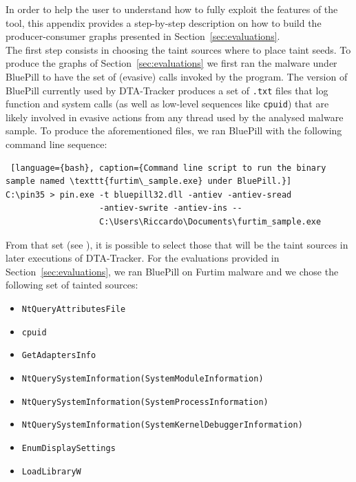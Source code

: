 \documentclass[LaM,binding=0.6cm]{sapthesis}
\begin{document}
In order to help the user to understand how to fully exploit the features of the tool, this appendix provides a step-by-step description on how to build the producer-consumer graphs presented in Section~\ref{sec:evaluations}.\\

The first step consists in choosing the taint sources where to place taint seeds. To produce the graphs of Section~\ref{sec:evaluations} we first ran the malware under BluePill to have the set of (evasive) calls invoked by the program. The version of BluePill currently used by {\sf DTA-Tracker} produces a set of \texttt{.txt} files that log function and system calls (as well as low-level sequences like {\tt cpuid}) that are likely involved in evasive actions from any thread used by the analysed malware sample. To produce the aforementioned files, we ran BluePill with the following command line sequence:
\begin{lstlisting} [language={bash}, caption={Command line script to run the binary sample named \texttt{furtim\_sample.exe} under BluePill.}]
C:\pin35 > pin.exe -t bluepill32.dll -antiev -antiev-sread 
				   -antiev-swrite -antiev-ins -- 
				   C:\Users\Riccardo\Documents\furtim_sample.exe
\end{lstlisting}

\noindent
From that set (see ), it is possible to select those that will be the taint sources in later executions of {\sf DTA-Tracker}. For the evaluations provided in Section~\ref{sec:evaluations}, we ran BluePill on Furtim malware and we chose the following set of tainted sources:
\begin{itemize}
\item \texttt{NtQueryAttributesFile}
\item \texttt{cpuid}
\item \texttt{GetAdaptersInfo}
\item \texttt{NtQuerySystemInformation(SystemModuleInformation)}
\item \texttt{NtQuerySystemInformation(SystemProc\-essInformation)}
\item \texttt{NtQuerySystemInformation(SystemKernelDebuggerInformation)}
\item \texttt{EnumDisplaySettings}
\item \texttt{LoadLibraryW}
\end{itemize}
\end{document}
